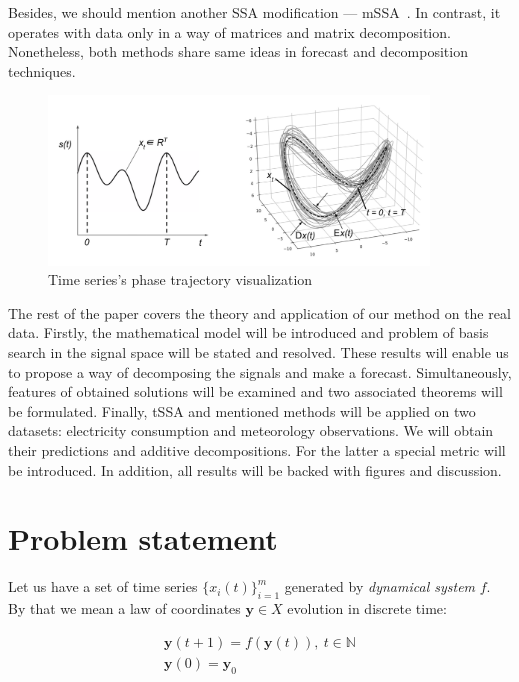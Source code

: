 	Besides, we should mention another SSA modification --- mSSA~\cite{mSSA_overview}. In contrast, it operates with data only in a way of matrices and matrix decomposition. Nonetheless, both methods share same ideas in forecast and decomposition techniques.
	
	\begin{figure}[h]
		\centering
		\includegraphics[width=0.9\textwidth, keepaspectratio]{../../figs/phase_traj.png}
		\caption{Time series's phase trajectory visualization }\label{pic:phase_traj}
	\end{figure}
	
	The rest of the paper covers the theory and application of our method on the real data. Firstly, the mathematical model will be introduced and problem of basis search in the signal space will be stated and resolved. These results will enable us to propose a way of decomposing the signals and make a forecast. Simultaneously, features of obtained solutions will be examined and two associated theorems will be formulated. Finally, tSSA and mentioned methods will be applied on two datasets: electricity consumption and meteorology observations. We will obtain their predictions and additive decompositions. For the latter a special metric will be introduced. In addition, all results will be backed with figures and discussion.
	
	\section{Problem statement}\label{sec:problem_statement}
	
	Let us have a set of time series $ \{x_i(t)\}_{i=1}^m $ generated by \emph{dynamical system} $ f $. By that we mean a law of coordinates $ \mathbf{y} \in X $ evolution in discrete time:
	
	\begin{gather*}
		\mathbf{y}(t + 1) = f(\mathbf{y}(t)), \ t \in \mathbb{N} \\
		\mathbf{y}(0) = \mathbf{y}_0
	\end{gather*}
	
